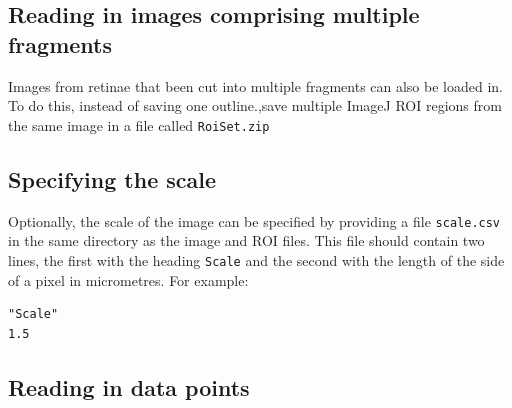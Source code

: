 \documentclass{book}
\begin{document}
\subsection{Reading in images comprising multiple fragments}
\label{retistruct-user-guide:sec:read-imag-compr}

Images from retinae that been cut into multiple fragments can also be
loaded in. To do this, instead of saving one outline.,save multiple
ImageJ ROI regions from the same image in a file called
\texttt{RoiSet.zip}

\subsection{Specifying the scale} Optionally, the scale of the image
can be specified by providing a file \texttt{scale.csv} in the same
directory as the image and ROI files. This file should contain two
lines, the first with the heading \texttt{Scale} and the second with
the length of the side of a pixel in micrometres. For example:
\begin{verbatim}
"Scale"
1.5
\end{verbatim}

\subsection{Reading in data points}
\label{retistruct-user-guide:sec:read-data-points}
\end{document}
